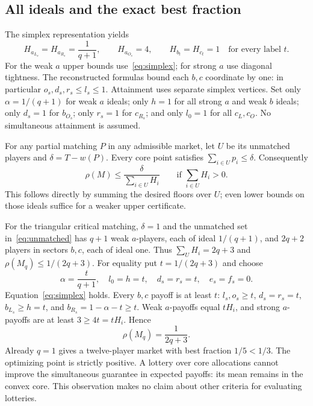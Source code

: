 \documentclass[11pt]{article}
\theoremstyle{remark}\newtheorem{remark}[theorem]{Remark}
\begin{document}
\subsection{All ideals and the exact best fraction}
The simplex representation yields
\begin{equation}\label{eq:ideals}
 H_{a_{L_s}}=H_{a_{R_s}}=\frac1{q+1},\qquad H_{a_{O_s}}=4,
 \qquad H_{b_t}=H_{c_t}=1\quad\text{for every label }t.
\end{equation}
For the weak $a$ upper bounds use~\eqref{eq:simplex}; for strong $a$ use
diagonal tightness. The reconstructed formulas bound each $b,c$ coordinate
by one: in particular $o_s,d_s,r_s\le l_s\le1$.
Attainment uses separate simplex vertices. Set only $\alpha=1/(q+1)$ for
weak $a$ ideals; only $h=1$ for all strong $a$ and weak $b$ ideals;
only $d_s=1$ for $b_{O_s}$; only $r_s=1$ for $c_{R_s}$; and only $l_0=1$
for all $c_L,c_O$. No simultaneous attainment is assumed.

For any partial matching $P$ in any admissible market, let $U$ be its
unmatched players and $\delta=T-w(P)$. Every core point satisfies
$\sum_{i\in U}p_i\le\delta$. Consequently
\begin{equation}\label{eq:protectiondual}
 \rho(M)\le\frac{\delta}{\sum_{i\in U}H_i}
 \qquad\text{if }\sum_{i\in U}H_i>0.
\end{equation}
This follows directly by summing the desired floors over $U$; even lower
bounds on those ideals suffice for a weaker upper certificate.

For the triangular critical matching, $\delta=1$ and the unmatched set
in~\eqref{eq:unmatched} has $q+1$ weak $a$-players, each of ideal
$1/(q+1)$, and $2q+2$ players in sectors $b,c$, each of ideal one.
Thus $\sum_U H_i=2q+3$ and $\rho(M_q)\le1/(2q+3)$.
For equality put $t=1/(2q+3)$ and choose
\[
 \alpha=\frac{t}{q+1},\quad l_0=h=t,\quad
 d_s=r_s=t,\quad e_s=f_s=0.
\]
Equation~\eqref{eq:simplex} holds. Every $b,c$ payoff is at least $t$:
$l_s,o_s\ge t$, $d_s=r_s=t$, $b_{L_s}\ge h=t$, and
$b_{R_s}=1-\alpha-t\ge t$. Weak $a$-payoffs equal $tH_i$, and strong
$a$-payoffs are at least $3\ge4t=tH_i$. Hence
\[
                         \rho(M_q)=\frac1{2q+3}.
\]
Already $q=1$ gives a twelve-player market with best fraction $1/5<1/3$.
The optimizing point is strictly positive. A lottery over core allocations
cannot improve the simultaneous guarantee in expected payoffs: its mean
remains in the convex core. This observation makes no claim about other
criteria for evaluating lotteries.
\end{document}
